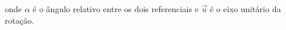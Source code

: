 onde $\alpha$ é o ângulo relativo entre os dois referenciais e $\vec u$ é o eixo unitário da rotação.

